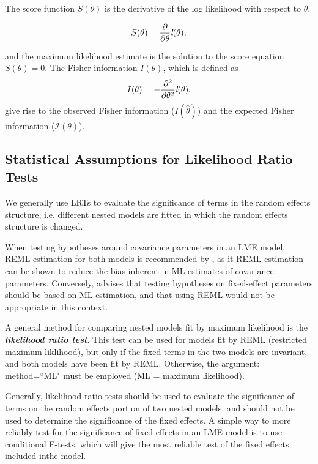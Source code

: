 \documentclass[12pt, a4paper]{report}
\theoremstyle{plain}
\theoremstyle{definition}
\theoremstyle{remark}
\begin{document}
	
	
	The score function $S(\theta)$ is the derivative of the log likelihood with respect to $\theta$,
	
	\[
	S(\theta) = \frac{\partial}{\partial \theta}\emph{l}(\theta),
	\]
	
	and the maximum likelihood estimate is the solution to the score equation $	S(\theta) = 0.$	The Fisher information $I(\theta)$, which is defined as
	\[
	I(\theta) = - \frac{\partial^2}{\partial \theta^2}\emph{l}(\theta),
	\]
	give rise to the observed Fisher information ($I(\hat{\theta})$) and the expected Fisher information ($\mathcal{I}(\theta)$).
	
	
	\subsection{Statistical Assumptions for Likelihood Ratio Tests}
	
	
	
	
	We generally use LRTs to evaluate the significance of terms in the random effects structure, i.e. different nested models are fitted in which the random effects structure is changed.
	
	
	When testing hypotheses around covariance parameters in an LME model, REML estimation for both models is recommended by \citep{west}, as it REML estimation can be shown to reduce the bias inherent in ML estimates of covariance parameters. Conversely, \citet{PB} advises that testing hypotheses on fixed-effect parameters should be based on ML estimation, and that using REML would not be appropriate in this context.
	
	A general method for comparing nested models fit by maximum likelihood is the \textbf{\emph{likelihood ratio test}}. This test can be used for models fit by REML (restricted maximum liklihood), but only if the fixed terms in the two models are invariant, and both models have been fit by REML. Otherwise, the argument: method=``ML" must be employed (ML = maximum likelihood).

Generally, likelihood ratio tests should be used to evaluate the significance of terms on the
		random effects portion of two nested models, and should not be used to determine the significance of the fixed effects.
		A simple way to more reliably test for the significance of fixed effects in an LME model is to use
		conditional F-tests, which will give the most reliable test of the fixed effects included inthe  model.
	
\end{document}
